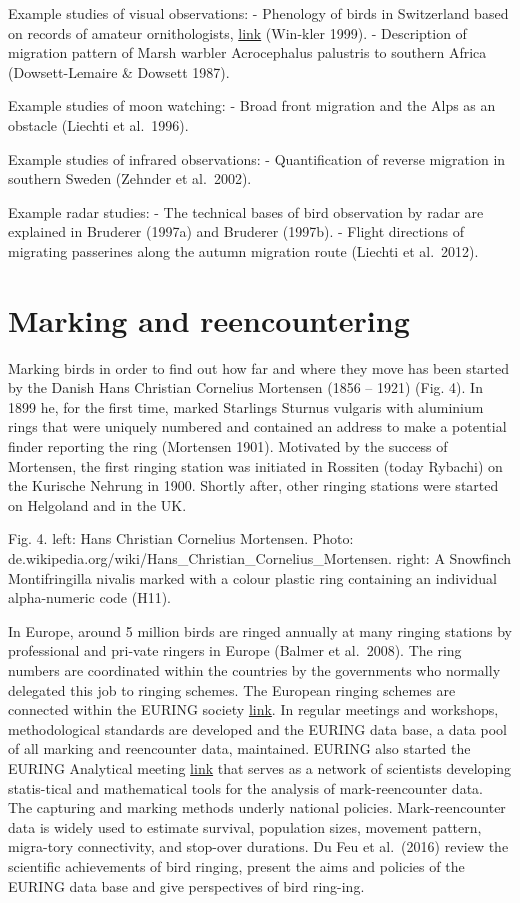 \documentclass[
]{book}
\begin{document}
Example studies of visual observations:
- Phenology of birds in Switzerland based on records of amateur ornithologists, \href{www.ornitho.ch}{link} (Win-kler 1999).
- Description of migration pattern of Marsh warbler Acrocephalus palustris to southern Africa (Dowsett-Lemaire \& Dowsett 1987).

Example studies of moon watching:
- Broad front migration and the Alps as an obstacle (Liechti et al.~1996).

Example studies of infrared observations:
- Quantification of reverse migration in southern Sweden (Zehnder et al.~2002).

Example radar studies:
- The technical bases of bird observation by radar are explained in Bruderer (1997a) and Bruderer (1997b).
- Flight directions of migrating passerines along the autumn migration route (Liechti et al.~2012).

\hypertarget{marking-and-reencountering}{%
\section{Marking and reencountering}\label{marking-and-reencountering}}

Marking birds in order to find out how far and where they move has been started by the Danish Hans Christian Cornelius Mortensen (1856 -- 1921) (Fig. 4). In 1899 he, for the first time, marked Starlings Sturnus vulgaris with aluminium rings that were uniquely numbered and contained an address to make a potential finder reporting the ring (Mortensen 1901). Motivated by the success of Mortensen, the first ringing station was initiated in Rossiten (today Rybachi) on the Kurische Nehrung in 1900. Shortly after, other ringing stations were started on Helgoland and in the UK.

Fig. 4. left: Hans Christian Cornelius Mortensen. Photo: de.wikipedia.org/wiki/Hans\_Christian\_Cornelius\_Mortensen. right: A Snowfinch Montifringilla nivalis marked with a colour plastic ring containing an individual alpha-numeric code (H11).

In Europe, around 5 million birds are ringed annually at many ringing stations by professional and pri-vate ringers in Europe (Balmer et al.~2008). The ring numbers are coordinated within the countries by the governments who normally delegated this job to ringing schemes. The European ringing schemes are connected within the EURING society \href{www.euring.org}{link}. In regular meetings and workshops, methodological standards are developed and the EURING data base, a data pool of all marking and reencounter data, maintained. EURING also started the EURING Analytical meeting \href{www.euring.org/meetings/analytical-meetings}{link} that serves as a network of scientists developing statis-tical and mathematical tools for the analysis of mark-reencounter data.\\
The capturing and marking methods underly national policies.
Mark-reencounter data is widely used to estimate survival, population sizes, movement pattern, migra-tory connectivity, and stop-over durations. Du Feu et al.~(2016) review the scientific achievements of bird ringing, present the aims and policies of the EURING data base and give perspectives of bird ring-ing.
\end{document}
